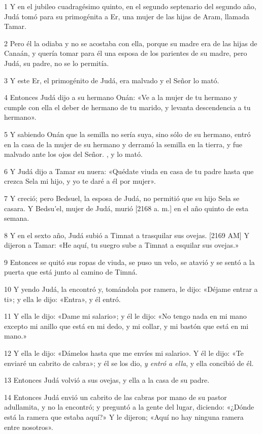 \par 1 Y en el jubileo cuadragésimo quinto, en el segundo septenario del segundo año, Judá tomó para su primogénita a Er, una mujer de las hijas de Aram, llamada Tamar.
\par 2 Pero él la odiaba y no se acostaba con ella, porque su madre era de las hijas de Canaán, y quería tomar para él una esposa de los parientes de su madre, pero Judá, su padre, no se lo permitía.
\par 3 Y este Er, el primogénito de Judá, era malvado y el Señor lo mató.
\par 4 Entonces Judá dijo a su hermano Onán: «Ve a la mujer de tu hermano y cumple con ella el deber de hermano de tu marido, y levanta descendencia a tu hermano».
\par 5 Y sabiendo Onán que la semilla no sería suya, sino sólo de su hermano, entró en la casa de la mujer de su hermano y derramó la semilla en la tierra, y fue malvado ante los ojos del Señor. , y lo mató.
\par 6 Y Judá dijo a Tamar su nuera: «Quédate viuda en casa de tu padre hasta que crezca Sela mi hijo, y yo te daré a él por mujer».
\par 7 Y creció; pero Bedsuel, la esposa de Judá, no permitió que su hijo Sela se casara. Y Bedsu'el, mujer de Judá, murió [2168 a. m.] en el año quinto de esta semana.
\par 8 Y en el sexto año, Judá subió a Timnat a trasquilar sus ovejas. [2169 AM] Y dijeron a Tamar: «He aquí, tu suegro sube a Timnat a esquilar sus ovejas.»
\par 9 Entonces se quitó sus ropas de viuda, se puso un velo, se atavió y se sentó a la puerta que está junto al camino de Timná.
\par 10 Y yendo Judá, la encontró y, tomándola por ramera, le dijo: «Déjame entrar a ti»; y ella le dijo: «Entra», y él entró.
\par 11 Y ella le dijo: «Dame mi salario»; y él le dijo: «No tengo nada en mi mano excepto mi anillo que está en mi dedo, y mi collar, y mi bastón que está en mi mano.»
\par 12 Y ella le dijo: «Dámelos hasta que me envíes mi salario». Y él le dijo: «Te enviaré un cabrito de cabra»; y él se los dio, \textit{y entró a ella}, y ella concibió de él.
\par 13 Entonces Judá volvió a sus ovejas, y ella a la casa de su padre.
\par 14 Entonces Judá envió un cabrito de las cabras por mano de su pastor adullamita, y no la encontró; y preguntó a la gente del lugar, diciendo: «¿Dónde está la ramera que estaba aquí?» Y le dijeron; «Aquí no hay ninguna ramera entre nosotros».
